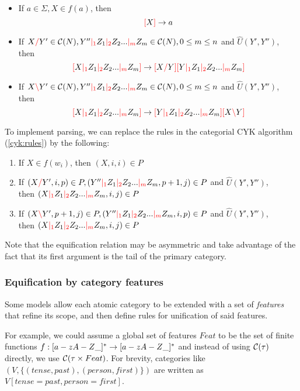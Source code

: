 \documentclass[main.tex]{subfiles}
\begin{document}
\begin{itemize}
    \item If $ a \in \Sigma, X \in f(a) $, then \[ \textcolor{red}{[} X \textcolor{red}{]} \rightarrow a \]
    \item If $ X \textcolor{red}{/} Y' \in \mathcal{C}( N ), Y'' \textcolor{red}{|_{1}} Z_1 \textcolor{red}{|_{2}} Z_2 ... \textcolor{red}{|_{m}} Z_m \in \mathcal{C}( N ), 0 \leq m \leq n $
        and $\hat{U}(Y', Y'')$, \\
        then \[ \textcolor{red}{[} X \textcolor{red}{|_{1}} Z_1 \textcolor{red}{|_{2}} Z_2 ... \textcolor{red}{|_{m}} Z_m \textcolor{red}{]} \rightarrow \textcolor{red}{[} X \textcolor{red}{/} Y \textcolor{red}{]} \textcolor{red}{[} Y \textcolor{red}{|_{1}} Z_1 \textcolor{red}{|_{2}} Z_2 ... \textcolor{red}{|_{m}} Z_m \textcolor{red}{]} \]
    \item If $ X \textcolor{red}{\backslash} Y' \in \mathcal{C}( N ), Y'' \textcolor{red}{|_{1}} Z_1 \textcolor{red}{|_{2}} Z_2 ... \textcolor{red}{|_{m}} Z_m \in \mathcal{C}( N ), 0 \leq m \leq n $
        and $\hat{U}(Y', Y'')$, \\
        then \[ \textcolor{red}{[} X \textcolor{red}{|_{1}} Z_1 \textcolor{red}{|_{2}} Z_2 ... \textcolor{red}{|_{m}} Z_m \textcolor{red}{]} \rightarrow \textcolor{red}{[} Y \textcolor{red}{|_{1}} Z_1 \textcolor{red}{|_{2}} Z_2 ... \textcolor{red}{|_{m}} Z_m \textcolor{red}{]} \textcolor{red}{[} X \textcolor{red}{\backslash} Y \textcolor{red}{]} \]
\end{itemize}

To implement parsing, we can replace the rules in the categorial CYK algorithm
(\cref{cyk:rules}) by the following:

\begin{enumerate}
    \item If $X \in f(w_i)$, then $(X, i, i) \in P$
    \item If $(X \textcolor{red}{/} Y', i, p) \in P, (Y'' \textcolor{red}{|_{1}} Z_1 \textcolor{red}{|_{2}} Z_2 ... \textcolor{red}{|_{m}} Z_m, p + 1, j) \in P$
        and $\hat{U}(Y', Y'')$, \\
        then $(X \textcolor{red}{|_{1}} Z_1 \textcolor{red}{|_{2}} Z_2 ... \textcolor{red}{|_{m}} Z_m, i, j) \in P$
    \item If $(X \textcolor{red}{\backslash} Y', p + 1, j) \in P, (Y'' \textcolor{red}{|_{1}} Z_1 \textcolor{red}{|_{2}} Z_2 ... \textcolor{red}{|_{m}} Z_m, i, p) \in P$
        and $\hat{U}(Y', Y'')$, \\
        then $(X \textcolor{red}{|_{1}} Z_1 \textcolor{red}{|_{2}} Z_2 ... \textcolor{red}{|_{m}} Z_m, i, j) \in P$
\end{enumerate}

Note that the equification relation may be asymmetric and take advantage of the fact
that its first argument is the tail of the primary category.

\subsubsection{Equification by category features}
Some models allow each atomic category to be extended with a set of \emph{features}
that refine its scope, and then define rules for unification of said features.

For example, we could assume a global set of features $Feat$ to be the
set of finite functions $f: [a-zA-Z\_]^* \rightarrow [a-zA-Z\_]^*$
and instead of using $\mathcal{C}( \tau )$ directly, we use $\mathcal{C}( \tau \times Feat )$.
For brevity, categories like $(V, \{ (tense, past), (person, first) \})$
are written as $V[tense=past, person=first]$.
\end{document}

